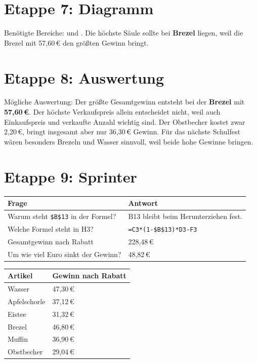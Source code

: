 \section*{Etappe 7: Diagramm}
Benötigte Bereiche:  und . Die höchste Säule sollte bei \textbf{Brezel} liegen, weil die Brezel mit 57,60\,\euro{} den größten Gewinn bringt.

\section*{Etappe 8: Auswertung}
Mögliche Auswertung: Der größte Gesamtgewinn entsteht bei der \textbf{Brezel} mit \textbf{57,60\,\euro{}}. Der höchste Verkaufspreis allein entscheidet nicht, weil auch Einkaufspreis und verkaufte Anzahl wichtig sind. Der Obstbecher kostet zwar 2,20\,\euro{}, bringt insgesamt aber nur 36,30\,\euro{} Gewinn. Für das nächste Schulfest wären besonders Brezeln und Wasser sinnvoll, weil beide hohe Gewinne bringen.

\section*{Etappe 9: Sprinter}
\begin{tabularx}{\textwidth}{|L{5cm}|Y|}
\hline
{}\textbf{Frage} & \textbf{Antwort}\\\hline
Warum steht \texttt{\$B\$13} in der Formel? & B13 bleibt beim Herunterziehen fest.\\\hline
Welche Formel steht in H3? & \texttt{=C3*(1-\$B\$13)*D3-F3}\\\hline
Gesamtgewinn nach Rabatt & 228,48\,\euro{}\\\hline
Um wie viel Euro sinkt der Gewinn? & 48,82\,\euro{}\\\hline
\end{tabularx}

\begin{tabularx}{\textwidth}{|Y|L{3cm}|}
\hline
{}\textbf{Artikel} & \textbf{Gewinn nach Rabatt}\\\hline
Wasser & 47,30\,\euro{}\\\hline
Apfelschorle & 37,12\,\euro{}\\\hline
Eistee & 31,32\,\euro{}\\\hline
Brezel & 46,80\,\euro{}\\\hline
Muffin & 36,90\,\euro{}\\\hline
Obstbecher & 29,04\,\euro{}\\\hline
\end{tabularx}
